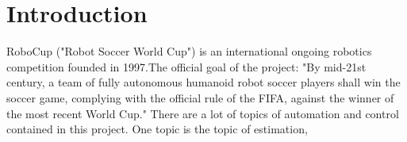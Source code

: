 
\chapter{Introduction}
RoboCup ("Robot Soccer World Cup") is an international ongoing robotics competition founded in 1997.The official goal of the project: "By mid-21st century, a team of fully autonomous humanoid robot soccer players shall win the soccer game, complying with the official rule of the FIFA, against the winner of the most recent World Cup." \cite{wwwRoboCup}
There are a lot of topics of automation and control contained in this project. One topic is the topic of estimation, 